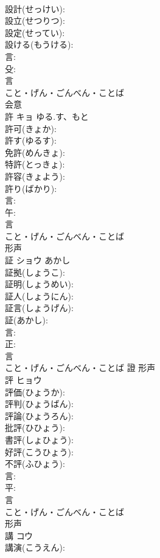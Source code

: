 \documentclass[8pt]{extreport}
\begin{document}
\begin{CJK}{UTF8}{min}
\\	設計(せっけい): 
\\	設立(せつりつ): 
\\	設定(せってい): 
\\	設ける(もうける): 
\\	言: 
\\	殳: 
\\	言	
\\	こと・げん・ごんべん・ことば	
\\	会意 
\\	許	キョ	ゆる.す、もと		
\\	許可(きょか): 
\\	許す(ゆるす): 
\\	免許(めんきょ): 
\\	特許(とっきょ): 
\\	許容(きょよう): 
\\	許り(ばかり): 
\\	言: 
\\	午: 
\\	言	
\\	こと・げん・ごんべん・ことば	
\\	形声 
\\	証	ショウ	あかし		
\\	証拠(しょうこ): 
\\	証明(しょうめい): 
\\	証人(しょうにん): 
\\	証言(しょうげん): 
\\	証(あかし): 
\\	言: 
\\	正: 
\\	言	
\\	こと・げん・ごんべん・ことば	證	形声 
\\	評	ヒョウ			
\\	評価(ひょうか): 
\\	評判(ひょうばん): 
\\	評論(ひょうろん): 
\\	批評(ひひょう): 
\\	書評(しょひょう): 
\\	好評(こうひょう): 
\\	不評(ふひょう): 
\\	言: 
\\	平: 
\\	言	
\\	こと・げん・ごんべん・ことば	
\\	形声 
\\	講	コウ			
\\	講演(こうえん): 

\end{CJK}
\end{document}
